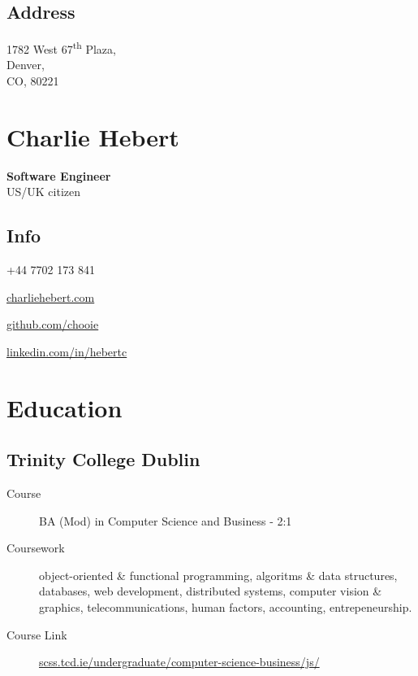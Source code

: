 \noindent\begin{minipage}[t]{0.333\textwidth}  
  \subsection*{Address}
  1782 West 67\textsuperscript{th} Plaza,\\
  Denver,\\
  CO, 80221\\
\end{minipage}
\noindent\begin{minipage}[t]{0.333\textwidth}
  \center
  \section*{Charlie Hebert}
  \textbf{Software Engineer}\\
  US/UK citizen
\end{minipage}
\noindent\begin{minipage}[t]{0.333\textwidth}
  \begin{flushright}
    \section*{Info}
  \end{flushright}

  \begin{description}
    \raggedleft
    \item[Mob] +44 7702 173 841
    \item[Web] \href{http://www.charliehebert.com}{charliehebert.com}
    \item[Github] \href{http://www.github.com/chooie}{github.com/chooie}
    \item[LinkedIn] \href{http://linkedin.com/in/hebertc}{linkedin.com/in/hebertc}
  \end{description}
\end{minipage}

\section*{Education}

\subsection*{Trinity College Dublin}
\begin{description}
  \item[Course] BA (Mod) in Computer Science and Business - 2:1
  \item[Coursework] object-oriented \& functional programming, algoritms \& data structures, databases, web development, distributed systems, computer vision \& graphics, telecommunications, human factors, accounting, entrepeneurship.
  \item[Course Link] \href{https://www.scss.tcd.ie/undergraduate/computer-science-business/js/}{scss.tcd.ie/undergraduate/computer-science-business/js/}
\end{description}

